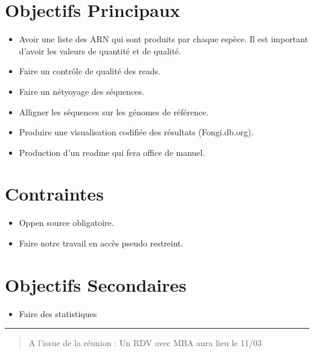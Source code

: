 \documentclass[a4paper, 11pt]{article}
\begin{document}
\section{Objectifs Principaux}
\begin{itemize}
    \item Avoir une liste des ARN qui sont produits par chaque espèce. Il est important d'avoir les valeurs de quantité et de qualité. 
    \item Faire un contrôle de qualité des reads.
    \item Faire un nétyoyage des séquences.
    \item Alligner les séquences sur les génomes de référence.
    \item Produire une visualisation codifiée des résultats (Fongi.db.org).
    \item Production d'un readme qui fera office de manuel.
\end{itemize}

\section{Contraintes}
\begin{itemize}
    \item Oppen source obligatoire.
    \item Faire notre travail en accès pseudo restreint.
\end{itemize}

\section{Objectifs Secondaires}
\begin{itemize}
    \item Faire des statistiques
\end{itemize}

\noindent\rule{8cm}{0.4pt}
\begin{quotation}
    A l'issue de la réunion : Un RDV avec MBA aura lieu le 11/03
\end{quotation}
\end{document}
